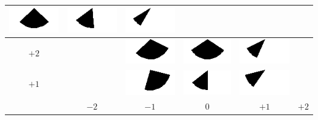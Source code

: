 \begin{tabular}{|c|c|c|c|c|c|}
	\includegraphics[width=0.045\linewidth]{img_Bereich/V1_img_Winkel_X_0_3000.png} &
	\includegraphics[width=0.045\linewidth]{img_Bereich/V1_img_Winkel_X_1000_3000.png} &
	\includegraphics[width=0.045\linewidth]{img_Bereich/V1_img_Winkel_X_2000_3000.png} \\ 
	\hline 
	$+2$ &&
	\includegraphics[width=0.045\linewidth]{img_Bereich/V1_img_Winkel_X_-1000_2000.png} &
	\includegraphics[width=0.045\linewidth]{img_Bereich/V1_img_Winkel_X_0_2000.png} &
	\includegraphics[width=0.045\linewidth]{img_Bereich/V1_img_Winkel_X_1000_2000.png} & \\ 
	\hline 
	$+1$ & &
	\includegraphics[width=0.045\linewidth]{img_Bereich/V1_img_Winkel_X_-1000_1000.png} &
	\includegraphics[width=0.045\linewidth]{img_Bereich/V1_img_Winkel_X_0_1000.png} &
	\includegraphics[width=0.045\linewidth]{img_Bereich/V1_img_Winkel_X_1000_1000.png} & \\ 
	\hline 
	& $-2$ & $-1$ &0& $+1$ & $+2$ \\ 
	\hline 
\end{tabular}